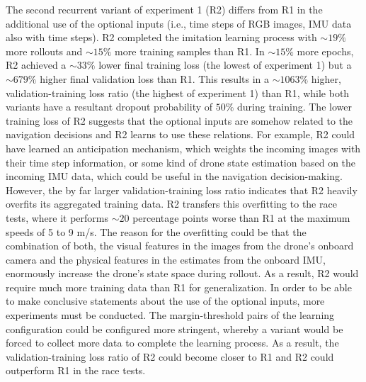 The second recurrent variant of experiment 1 (R2)
differs from R1 in the additional use of the optional inputs
(i.e., time steps of RGB images, IMU data also with time steps).
R2 completed the imitation learning process with $\sim 19 \%$ more rollouts
and $\sim 15 \%$ more training samples than R1.
In $\sim 15 \%$ more epochs,
R2 achieved a $\sim 33 \%$ lower final training loss (the lowest of experiment 1)
but a $\sim 679 \%$ higher final validation loss than R1.
This results in a $\sim 1063 \%$ higher, validation-training loss ratio 
(the highest of experiment 1)
than R1, while both variants have a resultant dropout probability of $50 \%$ during training.
The lower training loss of R2 suggests that the optional inputs
are somehow related to the navigation decisions and R2 learns to use these relations.
For example, R2 could have learned an anticipation mechanism,
which weights the incoming images with their time step information,
or some kind of drone state estimation based on the incoming IMU data,
which could be useful in the navigation decision-making.
However, the by far larger validation-training loss ratio 
indicates that R2 heavily overfits its aggregated training data.
R2 transfers this overfitting to the race tests,
where it performs $\sim 20$ percentage points worse than R1
at the maximum speeds of 5 to 9 m/s.
The reason for the overfitting could be that the combination of both, 
the visual features in the images from the drone's onboard camera
and the physical features in the estimates from the onboard IMU,
enormously increase the drone's state space during rollout.
As a result, R2 would require much more training data than R1 for generalization.
In order to be able to make conclusive statements about the use of the optional inputs,
more experiments must be conducted.
The margin-threshold pairs of the learning configuration could be configured more stringent,
whereby a variant would be forced to collect more data to complete the learning process.
As a result, the validation-training loss ratio of R2 could become closer to R1
and R2 could outperform R1 in the race tests.

